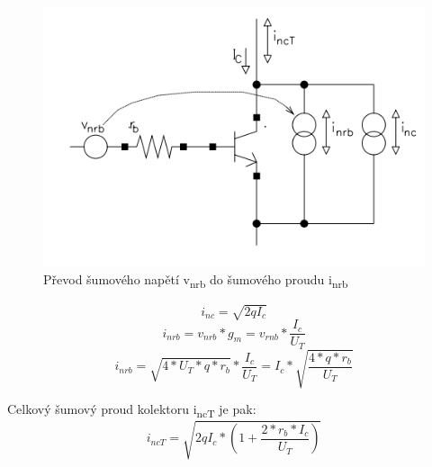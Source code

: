 \begin{figure}[h]
   \begin{center}
     \includegraphics[scale=0.5]{images/nrbBJT.png}
   \end{center}
   \caption{ Převod šumového napětí v\textsubscript{nrb} do šumového proudu i\textsubscript{nrb}}
\end{figure}
\begin{equation}
i_{nc} = \sqrt{2qI_{c}}
\end{equation}
\begin{equation}
i_{nrb} = v_{nrb}*g_{m}=v_{rnb}*\frac{I_{c}}{U_{T}}
\end{equation}
\begin{equation}
i_{nrb} = \sqrt{4*U_{T}*q*r_{b}}*\frac{I_{c}}{U_{T}}=I_{c}*\sqrt{\frac{4*q*r_{b}}{U_{T}}}
\end{equation}

Celkový šumový proud kolektoru i\textsubscript{ncT} je pak:
\begin{equation}
i_{ncT}=\sqrt{2qI_{c}*(1+\frac{2*r_{b}*I_{c}}{U_{T}})}
\end{equation}

